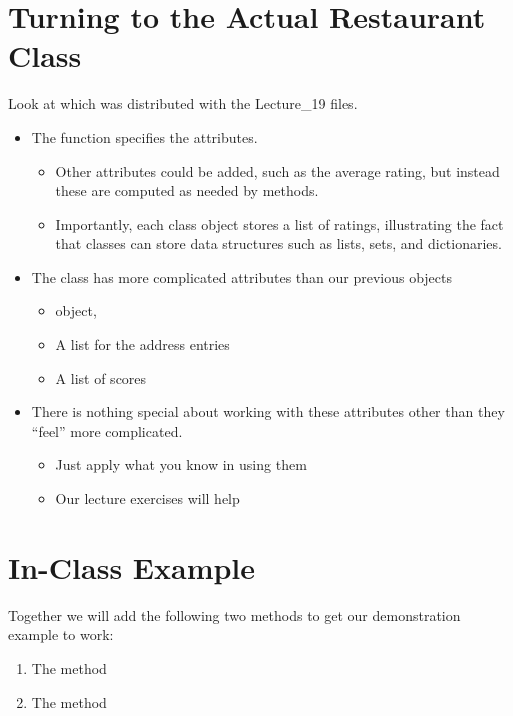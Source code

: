 \documentclass[letterpaper,10pt,english]{sphinxmanual}
\begin{document}
\section{Turning to the Actual Restaurant Class}
\label{\detokenize{lecture_notes/lec19_classes2:turning-to-the-actual-restaurant-class}}
Look at  which was distributed with the Lecture\_19
files.
\begin{itemize}
\item {} 
The  function specifies the attributes.
\begin{itemize}
\item {} 
Other attributes could be added, such as the average rating, but
instead these are computed as needed by methods.

\item {} 
Importantly, each class object stores a list of ratings,
illustrating the fact that classes can store data structures such
as lists, sets, and dictionaries.

\end{itemize}

\item {} 
The  class has more complicated attributes than our
previous objects
\begin{itemize}
\item {} 
 object,

\item {} 
A list for the address entries

\item {} 
A list of scores

\end{itemize}

\item {} 
There is nothing special about working with these attributes other
than they “feel” more complicated.
\begin{itemize}
\item {} 
Just apply what you know in using them

\item {} 
Our lecture exercises will help

\end{itemize}

\end{itemize}


\section{In-Class Example}
\label{\detokenize{lecture_notes/lec19_classes2:in-class-example}}
Together we will add the following two methods  to get
our demonstration example to work:
\begin{enumerate}
\item {} 
The  method

\item {} 
The  method

\end{enumerate}
\end{document}

